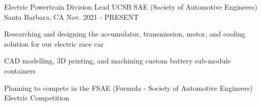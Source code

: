 


\cventry
{Electric Powertrain Division Lead} %
{UCSB SAE (Society of Automotive Engineers)} %
{Santa Barbara, CA} %
{Nov. 2021 - PRESENT} %
{ %
\begin{cvitems}
\item {Researching and designing the accumulator, transmission, motor, and cooling solution for our electric race car}
\item {CAD modelling, 3D printing, and machining custom battery sub-module containers}
\item {Planning to compete in the FSAE (Formula - Society of Automotive Engineers) Electric Competition}
\end{cvitems}
}



